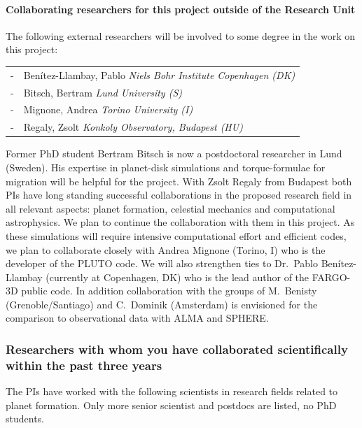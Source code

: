\documentclass[10pt,fleqn,twoside]{article}
\begin{document}
\paragraph{Collaborating researchers for this project outside of
  the Research Unit}
The following external researchers will be involved to some degree in the
work on this project:
\begin{center}
\begin{tabular}{cp{}}
 - & Ben\'itez-Llambay, Pablo \hfill {\em \small Niels Bohr Institute Copenhagen (DK)} \\[0.1cm]
 - & Bitsch, Bertram  \hfill {\em \small Lund University (S)} \\[0.1cm]
 - & Mignone, Andrea  \hfill {\em \small Torino University (I)} \\[0.1cm]
 - & Regaly, Zsolt \hfill {\em \small Konkoly Observatory, Budapest (HU)} \\[0.1cm]
\end{tabular}
\end{center}
Former PhD student Bertram Bitsch is now a postdoctoral researcher in Lund
(Sweden). His expertise in planet-disk simulations and torque-formulae for
migration will be helpful for the project.  With Zsolt Regaly from Budapest
both PIs have long standing successful collaborations in the proposed
research field in all relevant aspects: planet formation, celestial
mechanics and computational astrophysics. We plan to continue the
collaboration with them in this project. As these simulations will require
intensive computational effort and efficient codes, we plan to collaborate
closely with Andrea Mignone (Torino, I) who is the developer of the PLUTO
code.  We will also strengthen ties to Dr.\ Pablo Ben\'itez-Llambay
(currently at Copenhagen, DK) who is the lead author of the FARGO-3D public
code. In addition collaboration with the groups of M.~Benisty
(Grenoble/Santiago) and C.~Dominik (Amsterdam) is envisioned for the
comparison to observational data with ALMA and SPHERE.



\subsubsection{Researchers with whom you have collaborated scientifically within the past three years}
The PIs have worked with the following scientists in research fields related to planet formation.
Only more senior scientist and postdocs are listed, no PhD students.
\end{document}
